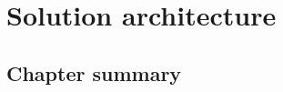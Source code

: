\chapter{Solution architecture} \label{chap:solution}

\section*{}


\section{\evm} \label{sec:solution:evm}

\section{Chapter summary}


